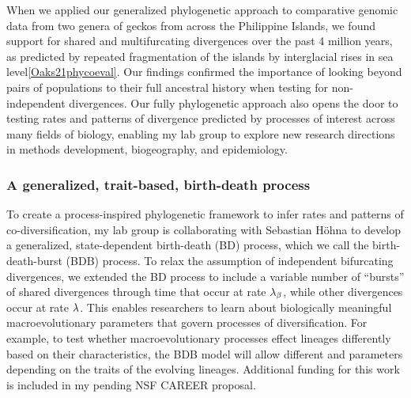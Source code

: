 When we applied our generalized phylogenetic approach to comparative genomic data
from two genera of geckos from across the Philippine Islands, we found support
for shared and multifurcating divergences over the past 4 million years,
as predicted by repeated fragmentation of the islands by interglacial rises
in sea
level\cref{Oaks21phycoeval}.
Our findings confirmed the importance of looking beyond pairs of populations to
their full ancestral history when testing for non-independent divergences.
Our fully phylogenetic approach also opens the door to testing rates and
patterns of divergence predicted by processes of interest across many fields of
biology,
enabling my lab group to explore new research directions in methods
development, biogeography, and epidemiology.


\subsubsection*{A generalized, trait-based, birth-death process}
To create a process-inspired phylogenetic framework to infer rates and patterns
of co-diversification,
my lab group is collaborating with Sebastian H\"ohna to develop a
generalized, state-dependent birth-death (BD) process, which we call the
birth-death-burst (BDB) process.
To relax the assumption of independent bifurcating divergences, we extended the
BD process to include a variable number of ``bursts'' of shared divergences through time that
occur at rate $\lambda_{\beta}$, while other divergences occur
at rate $\lambda$.
This enables researchers to learn about biologically
meaningful macroevolutionary parameters that govern processes of
diversification.
For example, to test whether macroevolutionary processes effect
lineages differently based on their characteristics, the BDB model will allow
different \speciationrate and \burstrate parameters depending on the traits of
the evolving lineages. 
Additional funding for this work is included in my pending NSF CAREER
proposal.

